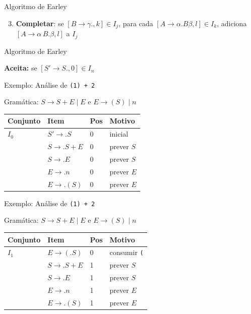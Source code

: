 \begin{frame}{Algoritmo de Earley}

    \begin{enumerate}
        \setcounter{enumi}{2}

        \item
        \textbf{Completar}: se \([B \to \gamma ., k] \in I_j\), para cada
        \([A \to \alpha . B \beta, l] \in I_k\), adiciona
        \([A \to \alpha\, B . \beta, l]\) a \(I_j\)
    \end{enumerate}
\end{frame}

\begin{frame}{Algoritmo de Earley}

    \textbf{Aceita:} se \([S' \to S ., 0] \in I_n\)
\end{frame}

\begin{frame}{Exemplo: Análise de \texttt{(1) + 2}}

    Gramática: \(S \to S+E \mid E\) e \(E \to (S) \mid n\)

    \begin{table}
        \begin{tabular}{l l l l}
            \hline
            Conjunto & Item & Pos & Motivo \\
            \hline
            \(I_0\) & \(S' \to . S\) & 0 & inicial \\
            & \(S \to . S+E\) & 0 & prever \(S\) \\
            & \(S \to . E\) & 0 & prever \(S\) \\
            & \(E \to . n\) & 0 & prever \(E\) \\
            & \(E \to . (S)\) & 0 & prever \(E\) \\
            \hline
        \end{tabular}
    \end{table}
\end{frame}

\begin{frame}[fragile]{Exemplo: Análise de
    \texttt{(1) + 2}}

    Gramática: \(S \to S+E \mid E\) e \(E \to (S) \mid n\)

    \begin{table}
        \begin{tabular}{l l l l}
            \hline
            Conjunto & Item & Pos & Motivo \\
            \hline
            \(I_1\) & \(E \to ( . S )\) & 0 & consumir
            \texttt{(} \\
            & \(S \to . S+E\) & 1 & prever \(S\) \\
            & \(S \to . E\) & 1 & prever \(S\) \\
            & \(E \to . n\) & 1 & prever \(E\) \\
            & \(E \to . (S)\) & 1 & prever \(E\) \\
            \hline
        \end{tabular}
    \end{table}
\end{frame}

